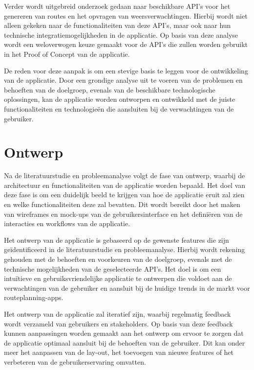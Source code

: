 \vspace{1cm}


Verder wordt uitgebreid onderzoek gedaan naar beschikbare API's voor het genereren van routes en het opvragen van weersverwachtingen. 
Hierbij wordt niet alleen gekeken naar de functionaliteiten van deze API's, maar ook naar hun technische integratiemogelijkheden in de applicatie. 
Op basis van deze analyse wordt een weloverwogen keuze gemaakt voor de API's die zullen worden gebruikt in het Proof of Concept van de applicatie.

\vspace{1cm}

De reden voor deze aanpak is om een stevige basis te leggen voor de ontwikkeling van de applicatie. 
Door een grondige analyse uit te voeren van de problemen en behoeften van de doelgroep, evenals van de beschikbare technologische oplossingen, 
kan de applicatie worden ontworpen en ontwikkeld met de juiste functionaliteiten en technologieën die aansluiten bij de verwachtingen van de gebruiker.

\section{Ontwerp}

Na de literatuurstudie en probleemanalyse volgt de fase van ontwerp, waarbij de architectuur en functionaliteiten van de applicatie worden bepaald. 
Het doel van deze fase is om een duidelijk beeld te krijgen van hoe de applicatie eruit zal zien en welke functionaliteiten deze zal bevatten. 
Dit wordt bereikt door het maken van wireframes en mock-ups van de gebruikersinterface en het definiëren van de interacties en workflows van de applicatie.

\vspace{1cm}


Het ontwerp van de applicatie is gebaseerd op de gewenste features die zijn geïdentificeerd in de literatuurstudie en probleemanalyse. 
Hierbij wordt rekening gehouden met de behoeften en voorkeuren van de doelgroep, evenals met de technische mogelijkheden van de geselecteerde API's. 
Het doel is om een intuïtieve en gebruiksvriendelijke applicatie te ontwerpen die voldoet aan de verwachtingen van de gebruiker en aansluit bij de huidige trends in de markt voor routeplanning-apps.

\vspace{1cm}


Het ontwerp van de applicatie zal iteratief zijn, waarbij regelmatig feedback wordt verzameld van gebruikers en stakeholders. 
Op basis van deze feedback kunnen aanpassingen worden gemaakt aan het ontwerp om ervoor te zorgen dat de applicatie optimaal aansluit bij de behoeften van de gebruiker. 
Dit kan onder meer het aanpassen van de lay-out, het toevoegen van nieuwe features of het verbeteren van de gebruikerservaring omvatten.

